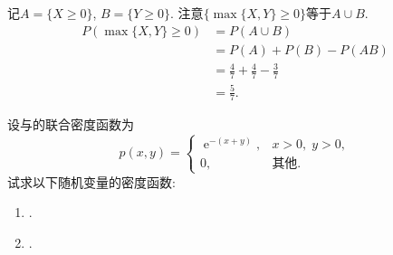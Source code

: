 \documentclass[../main.tex]{subfiles}
\begin{document}
\begin{solution}
记\(A=\{X\ge0\}\), \(B=\{Y\ge0\}\). 注意\(\{\max\{X,Y\}\ge0\}\)等于\(A\cup B\). 
\[
\begin{aligned}
P(\max\{X,Y\}\ge0) &= P(A\cup B) \\
&= P(A) + P(B) - P(AB) \\
&= \frac{4}{7} + \frac{4}{7} - \frac{3}{7} \\
&= \frac{5}{7}.
\end{aligned}
\]
\end{solution}
\begin{exercise}{}{}
设与的联合密度函数为
\[
p(x,y)=
\begin{cases}
\operatorname{e}^{-(x+y)}, & x>0,\;y>0,\\
0, & \text{其他.}
\end{cases}
\]
试求以下随机变量的密度函数:

\begin{enumerate}
\item
{}.

\item
{}.
\end{enumerate}
\end{exercise}
\end{document}
